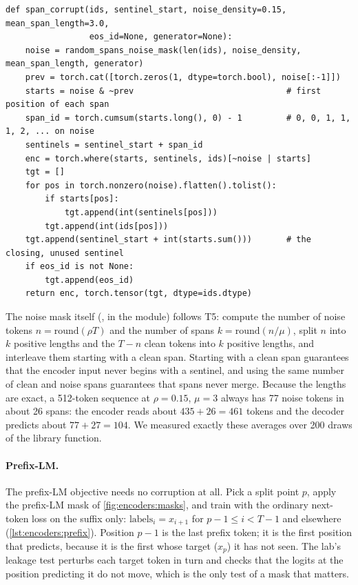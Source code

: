 \begin{lstlisting}[caption={Span corruption from a noise mask (from \ident{llmsys/encoder.py}).},label={lst:encoders:span}]
def span_corrupt(ids, sentinel_start, noise_density=0.15, mean_span_length=3.0,
                 eos_id=None, generator=None):
    noise = random_spans_noise_mask(len(ids), noise_density, mean_span_length, generator)
    prev = torch.cat([torch.zeros(1, dtype=torch.bool), noise[:-1]])
    starts = noise & ~prev                               # first position of each span
    span_id = torch.cumsum(starts.long(), 0) - 1         # 0, 0, 1, 1, 1, 2, ... on noise
    sentinels = sentinel_start + span_id
    enc = torch.where(starts, sentinels, ids)[~noise | starts]
    tgt = []
    for pos in torch.nonzero(noise).flatten().tolist():
        if starts[pos]:
            tgt.append(int(sentinels[pos]))
        tgt.append(int(ids[pos]))
    tgt.append(sentinel_start + int(starts.sum()))       # the closing, unused sentinel
    if eos_id is not None:
        tgt.append(eos_id)
    return enc, torch.tensor(tgt, dtype=ids.dtype)
\end{lstlisting}

The noise mask itself (, in the module) follows T5: compute the
number of noise tokens $n=\mathrm{round}(\rho T)$ and the number of spans $k=\mathrm{round}(n/\mu)$,
split $n$ into $k$ positive lengths and the $T-n$ clean tokens into $k$ positive lengths, and
interleave them starting with a clean span. Starting with a clean span guarantees that the encoder
input never begins with a sentinel, and using the same number of clean and noise spans guarantees
that spans never merge. Because the lengths are exact, a 512-token sequence at $\rho=0.15$, $\mu=3$
always has 77 noise tokens in about 26 spans: the encoder reads about $435+26=461$ tokens and the
decoder predicts about $77+27=104$. We measured exactly these averages over 200 draws of the library
function.

\paragraph{Prefix-LM.} The prefix-LM objective needs no corruption at all. Pick a split point $p$,
apply the prefix-LM mask of \cref{fig:encoders:masks}, and train with the ordinary next-token loss on
the suffix only: $\text{labels}_i = x_{i+1}$ for $p-1\le i<T-1$ and  elsewhere
(\cref{lst:encoders:prefix}). Position $p-1$ is the last prefix token; it is the first position that
predicts, because it is the first whose target ($x_p$) it has not seen. The lab's leakage test
perturbs each target token in turn and checks that the logits at the position predicting it do not
move, which is the only test of a mask that matters.

